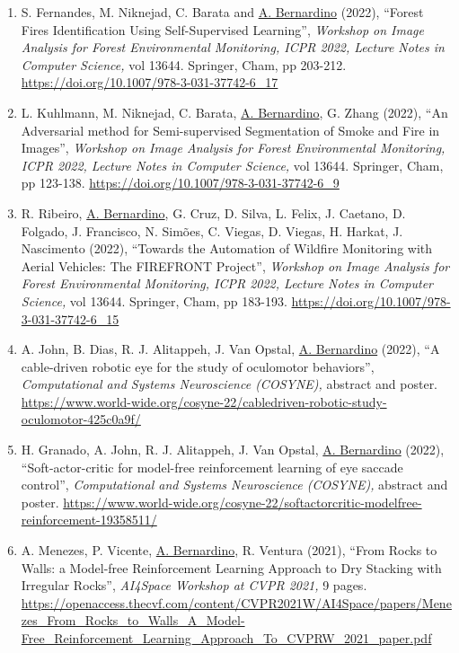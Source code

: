 \documentclass[
]{article}
\begin{document}
\begin{enumerate}
{  in Computer Science,} vol 13644. Springer, Cham, pp 194-202.
  \url{https://doi.org/10.1007/978-3-031-37742-6_16}
\item
  S. Fernandes, M. Niknejad, C. Barata and \ul{A. Bernardino} (2022),
  ``Forest Fires Identification Using Self-Supervised Learning'',
  \emph{Workshop on Image Analysis for Forest Environmental Monitoring,
  ICPR 2022, Lecture Notes in Computer Science,} vol 13644. Springer,
  Cham, pp 203-212. \url{https://doi.org/10.1007/978-3-031-37742-6_17}
\item
  L. Kuhlmann, M. Niknejad, C. Barata, \ul{A. Bernardino}, G. Zhang
  (2022), ``An Adversarial method for Semi-supervised Segmentation of
  Smoke and Fire in Images'', \emph{Workshop on Image Analysis for
  Forest Environmental Monitoring, ICPR 2022, Lecture Notes in Computer
  Science,} vol 13644. Springer, Cham, pp 123-138.
  \url{https://doi.org/10.1007/978-3-031-37742-6_9}
\item
  R. Ribeiro, \ul{A. Bernardino}, G. Cruz, D. Silva, L. Felix, J.
  Caetano, D. Folgado, J. Francisco, N. Simões, C. Viegas, D. Viegas, H.
  Harkat, J. Nascimento (2022), ``Towards the Automation of Wildfire
  Monitoring with Aerial Vehicles: The FIREFRONT Project'',
  \emph{Workshop on Image Analysis for Forest Environmental Monitoring,
  ICPR 2022, Lecture Notes in Computer Science,} vol 13644. Springer,
  Cham, pp 183-193. \url{https://doi.org/10.1007/978-3-031-37742-6_15}
\item
  A. John, B. Dias, R. J. Alitappeh, J. Van Opstal, \ul{A. Bernardino}
  (2022), ``A cable-driven robotic eye for the study of oculomotor
  behaviors'', \emph{Computational and Systems Neuroscience (COSYNE),}
  abstract and poster.
  \url{https://www.world-wide.org/cosyne-22/cabledriven-robotic-study-oculomotor-425c0a9f/}
\item
  H. Granado, A. John, R. J. Alitappeh, J. Van Opstal, \ul{A.
  Bernardino} (2022), ``Soft-actor-critic for model-free reinforcement
  learning of eye saccade control'', \emph{Computational and Systems
  Neuroscience (COSYNE),} abstract and poster.
  \url{https://www.world-wide.org/cosyne-22/softactorcritic-modelfree-reinforcement-19358511/}
\item
  A. Menezes, P. Vicente, \ul{A. Bernardino}, R. Ventura (2021), ``From
  Rocks to Walls: a Model-free Reinforcement Learning Approach to Dry
  Stacking with Irregular Rocks'', \emph{AI4Space Workshop at CVPR
  2021,} 9 pages.
  \url{https://openaccess.thecvf.com/content/CVPR2021W/AI4Space/papers/Menezes_From_Rocks_to_Walls_A_Model-Free_Reinforcement_Learning_Approach_To_CVPRW_2021_paper.pdf}~

\end{enumerate}
\end{document}
